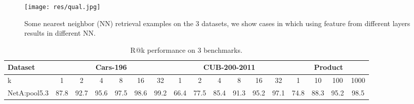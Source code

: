 \documentclass[10pt,twocolumn,letterpaper]{article}
\begin{document}
\begin{figure*}
\begin{center}
  \texttt{[image: res/qual.jpg]}
  \caption{Some nearest neighbor (NN) retrieval examples on the 3 datasets, we show cases in which using feature from different layers results in different NN.}
  \label{fig:qual}
\end{center}
\end{figure*}


\setlength{\tabcolsep}{5.1pt}
\begin{center}
\begin{table*}[]
\begin{center}
\centering
\label{table:benchmarks0}
\caption{R@k performance on 3 benchmarks.}
\begin{tabular}{| l || cccccc || c ccccc || c ccc |}
\hline
Dataset  & \multicolumn{6}{c||}{Cars-196} 
       & \multicolumn{6}{c||}{CUB-200-2011} 
       & \multicolumn{4}{c|}{Product} 
       \\
\hline

k  &    1 & 2 & 4 & 8 & 16 & 32
        &  1 & 2 & 4 & 8 & 16 & 32
        &  1 & 10 & 100 & 1000
       \\
       
\hline
\hline


NetA:pool5.3  &  87.8 & 92.7 & 95.6 & 97.5 & 98.6 & 99.2
          &  66.4 & 77.5 & 85.4 & 91.3 & 95.2 & 97.1
          &  74.8 & 88.3 & 95.2 & 98.5 \\

\hline

\end{tabular}
\label{table:benchmarks0}
\end{center}
\end{table*}
\end{center}
\end{document}
